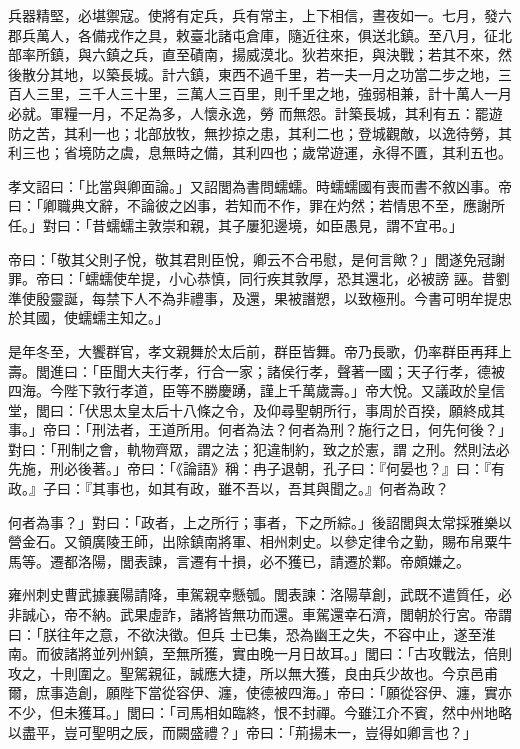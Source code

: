 \begin{pinyinscope}
 兵器精堅，必堪禦寇。使將有定兵，兵有常主，上下相信，晝夜如一。七月，發六郡兵萬人，各備戎作之具，敕臺北諸屯倉庫，隨近往來，俱送北鎮。至八月，征北部率所鎮，與六鎮之兵，直至磧南，揚威漠北。狄若來拒，與決戰；若其不來，然後散分其地，以築長城。計六鎮，東西不過千里，若一夫一月之功當二步之地，三百人三里，三千人三十里，三萬人三百里，則千里之地，強弱相兼，計十萬人一月必就。軍糧一月，不足為多，人懷永逸，勞
 而無怨。計築長城，其利有五：罷遊防之苦，其利一也；北部放牧，無抄掠之患，其利二也；登城觀敵，以逸待勞，其利三也；省境防之虞，息無時之備，其利四也；歲常遊運，永得不匱，其利五也。



 孝文詔曰：「比當與卿面論。」又詔閭為書問蠕蠕。時蠕蠕國有喪而書不敘凶事。帝曰：「卿職典文辭，不論彼之凶事，若知而不作，罪在灼然；若情思不至，應謝所任。」對曰：「昔蠕蠕主敦崇和親，其子屢犯邊境，如臣愚見，謂不宜弔。」



 帝曰：「敬其父則子悅，敬其君則臣悅，卿云不合弔慰，是何言歟？」閭遂免冠謝罪。帝曰：「蠕蠕使牟提，小心恭慎，同行疾其敦厚，恐其還北，必被謗
 誣。昔劉準使殷靈誕，每禁下人不為非禮事，及還，果被譖愬，以致極刑。今書可明牟提忠於其國，使蠕蠕主知之。」



 是年冬至，大饗群官，孝文親舞於太后前，群臣皆舞。帝乃長歌，仍率群臣再拜上壽。閭進曰：「臣聞大夫行孝，行合一家；諸侯行孝，聲著一國；天子行孝，德被四海。今陛下敦行孝道，臣等不勝慶踴，謹上千萬歲壽。」帝大悅。又議政於皇信堂，閭曰：「伏思太皇太后十八條之令，及仰尋聖朝所行，事周於百揆，願終成其事。」帝曰：「刑法者，王道所用。何者為法？何者為刑？施行之日，何先何後？」對曰：「刑制之會，軌物齊眾，謂之法；犯違制約，致之於憲，謂
 之刑。然則法必先施，刑必後著。」帝曰：「《論語》稱：冉子退朝，孔子曰：『何晏也？』曰：『有政。』子曰：『其事也，如其有政，雖不吾以，吾其與聞之。』何者為政？



 何者為事？」對曰：「政者，上之所行；事者，下之所綜。」後詔閭與太常採雅樂以營金石。又領廣陵王師，出除鎮南將軍、相州刺史。以參定律令之勤，賜布帛粟牛馬等。遷都洛陽，閭表諫，言遷有十損，必不獲已，請遷於鄴。帝頗嫌之。



 雍州刺史曹武據襄陽請降，車駕親幸懸瓠。閭表諫：洛陽草創，武既不遣質任，必非誠心，帝不納。武果虛詐，諸將皆無功而還。車駕還幸石濟，閭朝於行宮。帝謂曰：「朕往年之意，不欲決徵。但兵
 士已集，恐為幽王之失，不容中止，遂至淮南。而彼諸將並列州鎮，至無所獲，實由晚一月日故耳。」閭曰：「古攻戰法，倍則攻之，十則圍之。聖駕親征，誠應大捷，所以無大獲，良由兵少故也。今京邑甫爾，庶事造創，願陛下當從容伊、瀍，使德被四海。」帝曰：「願從容伊、瀍，實亦不少，但未獲耳。」閭曰：「司馬相如臨終，恨不封禪。今雖江介不賓，然中州地略以盡平，豈可聖明之辰，而闕盛禮？」帝曰：「荊揚未一，豈得如卿言也？」




\end{pinyinscope}
